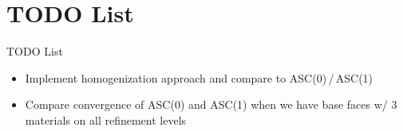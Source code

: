 \documentclass{beamer}
\newcommand{\includegraphicsw}[2][1.]{\texttt{[image: \#2]}}
\newcommand{\vect}[1]{\boldsymbol{\mathbf{#1}}}
\begin{document}
	\section{TODO List}
	
	\begin{frame}{TODO List}
		\begin{itemize}
			\item Implement homogenization approach and compare to ASC(0)\,/\,ASC(1)
			\item Compare convergence of ASC(0) and ASC(1) when we have base faces w/ 3 materials on all refinement levels 
		\end{itemize}
	\end{frame}
	
%
%
\end{document}
